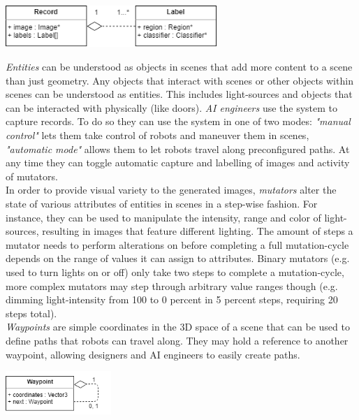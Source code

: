 \begin{center}
\noindent\includegraphics[width=8cm]{tex/img/ch04/Classes_Record01.png}
\label{fig:classes-record}
\end{center}
\emph{Entities} can be understood as objects in scenes that add more content to a scene than just geometry. Any objects that interact with scenes or other objects within scenes can be understood as entities. This includes light-sources and objects that can be interacted with physically (like doors).
\emph{\acs{AI} engineers} use the system to capture records. To do so they can use the system in one of two modes: \emph{"manual control"} lets them take control of robots and maneuver them in scenes, \emph{"automatic mode"} allows them to let robots travel along preconfigured paths. At any time they can toggle automatic capture and labelling of images and activity of mutators.\\
In order to provide visual variety to the generated images, \emph{mutators} alter the state of various attributes of entities in scenes in a step-wise fashion. For instance, they can be used to manipulate the intensity, range and color of light-sources, resulting in images that feature different lighting. The amount of steps a mutator needs to perform alterations on before completing a full mutation-cycle depends on the range of values it can assign to attributes. Binary mutators (e.g. used to turn lights on or off) only take two steps to complete a mutation-cycle, more complex mutators may step through arbitrary value ranges though (e.g. dimming light-intensity from 100 to 0 percent in 5 percent steps, requiring 20 steps total). \\
\emph{Waypoints} are simple coordinates in the 3D space of a scene that can be used to define paths that robots can travel along. They may hold a reference to another waypoint, allowing designers and \acs{AI} engineers to easily create paths.  
\begin{center}
\noindent\includegraphics[width=4cm]{tex/img/ch04/Classes_Waypoint02.png}
\label{fig:classes-waypoint}
\end{center}


